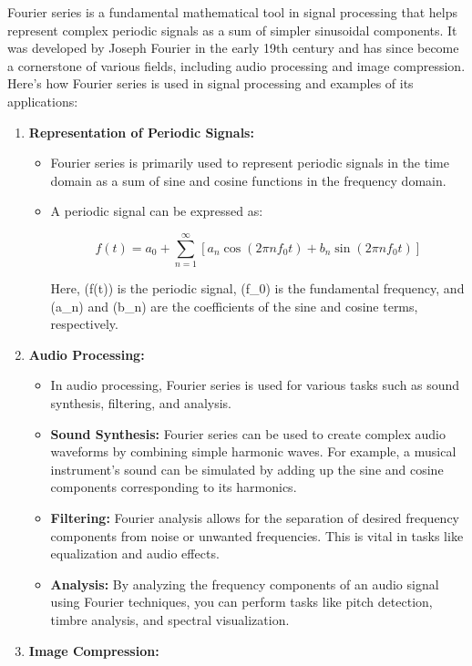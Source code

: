 \documentclass[11pt]{article}
\providecommand{\tightlist}{%
      \setlength{\itemsep}{0pt}\setlength{\parskip}{0pt}}
\begin{document}
Fourier series is a fundamental mathematical tool in signal processing
that helps represent complex periodic signals as a sum of simpler
sinusoidal components. It was developed by Joseph Fourier in the early
19th century and has since become a cornerstone of various fields,
including audio processing and image compression. Here's how Fourier
series is used in signal processing and examples of its applications:

\begin{enumerate}
\def\labelenumi{\arabic{enumi}.}
\tightlist
\item
  \textbf{Representation of Periodic Signals:}

  \begin{itemize}
  \item
    Fourier series is primarily used to represent periodic signals in
    the time domain as a sum of sine and cosine functions in the
    frequency domain.
  \item
    A periodic signal can be expressed as:

    \[
    f(t) = a_0 + \sum_{n=1}^{\infty} \left[ a_n \cos(2\pi nf_0 t) + b_n \sin(2\pi nf_0 t) \right]
    \]

    Here, (f(t)) is the periodic signal, (f\_0) is the fundamental
    frequency, and (a\_n) and (b\_n) are the coefficients of the sine
    and cosine terms, respectively.
  \end{itemize}
\item
  \textbf{Audio Processing:}

  \begin{itemize}
  \tightlist
  \item
    In audio processing, Fourier series is used for various tasks such
    as sound synthesis, filtering, and analysis.
  \item
    \textbf{Sound Synthesis:} Fourier series can be used to create
    complex audio waveforms by combining simple harmonic waves. For
    example, a musical instrument's sound can be simulated by adding up
    the sine and cosine components corresponding to its harmonics.
  \item
    \textbf{Filtering:} Fourier analysis allows for the separation of
    desired frequency components from noise or unwanted frequencies.
    This is vital in tasks like equalization and audio effects.
  \item
    \textbf{Analysis:} By analyzing the frequency components of an audio
    signal using Fourier techniques, you can perform tasks like pitch
    detection, timbre analysis, and spectral visualization.
  \end{itemize}
\item
  \textbf{Image Compression:}


\end{enumerate}
\end{document}
